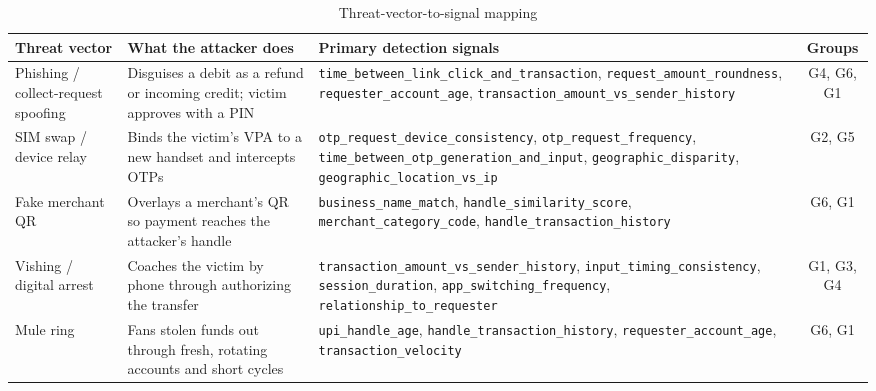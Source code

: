 \documentclass[conference]{IEEEtran}
\newcommand{\tabfont}{\footnotesize}
\begin{document}
\begin{table}[!t]
\caption{Threat-vector-to-signal mapping}\label{tab:threat}
\centering\tabfont
\begin{tabularx}{\textwidth}{@{}l Y Y c@{}}
\toprule
\textbf{Threat vector} & \textbf{What the attacker does} & \textbf{Primary detection signals} & \textbf{Groups}\\
\midrule
Phishing / collect-request spoofing & Disguises a debit as a refund or incoming credit; victim approves with a PIN & \texttt{time\_\allowbreak{}between\_\allowbreak{}link\_\allowbreak{}click\_\allowbreak{}and\_\allowbreak{}transaction}, \texttt{request\_\allowbreak{}amount\_\allowbreak{}roundness}, \texttt{requester\_\allowbreak{}account\_\allowbreak{}age}, \texttt{transaction\_\allowbreak{}amount\_\allowbreak{}vs\_\allowbreak{}sender\_\allowbreak{}history} & G4, G6, G1\\
SIM swap / device relay & Binds the victim's VPA to a new handset and intercepts OTPs & \texttt{otp\_\allowbreak{}request\_\allowbreak{}device\_\allowbreak{}consistency}, \texttt{otp\_\allowbreak{}request\_\allowbreak{}frequency}, \texttt{time\_\allowbreak{}between\_\allowbreak{}otp\_\allowbreak{}generation\_\allowbreak{}and\_\allowbreak{}input}, \texttt{geographic\_\allowbreak{}disparity}, \texttt{geographic\_\allowbreak{}location\_\allowbreak{}vs\_\allowbreak{}ip} & G2, G5\\
Fake merchant QR & Overlays a merchant's QR so payment reaches the attacker's handle & \texttt{business\_\allowbreak{}name\_\allowbreak{}match}, \texttt{handle\_\allowbreak{}similarity\_\allowbreak{}score}, \texttt{merchant\_\allowbreak{}category\_\allowbreak{}code}, \texttt{handle\_\allowbreak{}transaction\_\allowbreak{}history} & G6, G1\\
Vishing / digital arrest & Coaches the victim by phone through authorizing the transfer & \texttt{transaction\_\allowbreak{}amount\_\allowbreak{}vs\_\allowbreak{}sender\_\allowbreak{}history}, \texttt{input\_\allowbreak{}timing\_\allowbreak{}consistency}, \texttt{session\_\allowbreak{}duration}, \texttt{app\_\allowbreak{}switching\_\allowbreak{}frequency}, \texttt{relationship\_\allowbreak{}to\_\allowbreak{}requester} & G1, G3, G4\\
Mule ring & Fans stolen funds out through fresh, rotating accounts and short cycles & \texttt{upi\_\allowbreak{}handle\_\allowbreak{}age}, \texttt{handle\_\allowbreak{}transaction\_\allowbreak{}history}, \texttt{requester\_\allowbreak{}account\_\allowbreak{}age}, \texttt{transaction\_\allowbreak{}velocity} & G6, G1\\
\bottomrule
\end{tabularx}
\end{table}
\end{document}
